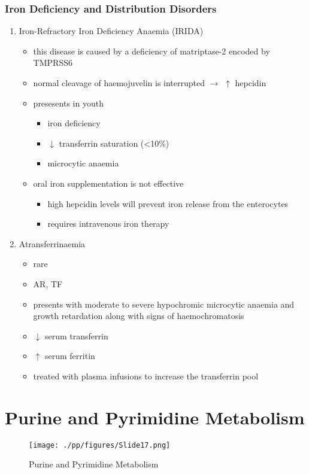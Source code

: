 \documentclass{scrartcl}
\begin{document}
\subsubsection{Iron Deficiency and Distribution Disorders}
\label{sec:org2ca556c}
\begin{enumerate}
\item Iron-Refractory Iron Deficiency Anaemia (IRIDA)
\label{sec:orgc1c1526}
\begin{itemize}
\item this disease is caused by a deficiency of matriptase-2 encoded by TMPRSS6
\item normal cleavage of haemojuvelin is interrupted \(\to\) \(\uparrow\) hepcidin
\item presesents in youth
\begin{itemize}
\item iron deficiency
\item \(\downarrow\) transferrin saturation (<10\%)
\item microcytic anaemia
\end{itemize}
\item oral iron supplementation is not effective
\begin{itemize}
\item high hepcidin levels will prevent iron release from the
enterocytes
\item requires intravenous iron therapy
\end{itemize}
\end{itemize}

\item Atransferrinaemia
\label{sec:orgccb08ef}
\begin{itemize}
\item rare
\item AR, TF
\item presents with moderate to severe hypochromic microcytic anaemia and
growth retardation along with signs of haemochromatosis
\item \(\downarrow\) serum transferrin
\item \(\uparrow\) serum ferritin
\item treated with plasma infusions to increase the transferrin pool
\end{itemize}
\end{enumerate}
\section{Purine and Pyrimidine Metabolism}
\label{sec:org484ede1}
\begin{figure}[htbp]
\centering
\texttt{[image: ./pp/figures/Slide17.png]}
\caption{\label{fig:org3429641}
Purine and Pyrimidine Metabolism}
\end{figure}
\end{document}
